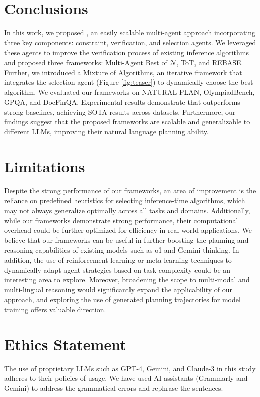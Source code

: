 \section{Conclusions}
\label{sec:conclusions}

In this work, we proposed \plangen{}, an easily scalable multi-agent approach incorporating three key components: constraint, verification, and selection agents. We leveraged these agents to improve the verification process of existing inference algorithms and proposed three frameworks: Multi-Agent Best of $\mathcal{N}$, ToT, and REBASE. Further, we introduced a Mixture of Algorithms, an iterative framework that integrates the selection agent (Figure \ref{fig:teaser}) to dynamically choose the best algorithm. We evaluated our frameworks on NATURAL PLAN, OlympiadBench, GPQA, and DocFinQA. Experimental results demonstrate that \plangen{} outperforms strong baselines, achieving SOTA results across datasets. Furthermore, our findings suggest that the proposed frameworks are scalable and generalizable to different LLMs, improving their natural language planning ability.


\section*{Limitations}

Despite the strong performance of our frameworks, an area of improvement is the reliance on predefined heuristics for selecting inference-time algorithms, which may not always generalize optimally across all tasks and domains. Additionally, while our frameworks demonstrate strong performance, their computational overhead could be further optimized for efficiency in real-world applications. We believe that our frameworks can be useful in further boosting the planning and reasoning capabilities of existing models such as o1 and Gemini-thinking. In addition, the use of reinforcement learning or meta-learning techniques to dynamically adapt agent strategies based on task complexity could be an interesting area to explore. Moreover, broadening the scope to multi-modal and multi-lingual reasoning would significantly expand the applicability of our approach, and exploring the use of generated planning trajectories for model training offers valuable direction.

\section*{Ethics Statement}

The use of proprietary LLMs such as GPT-4, Gemini, and Claude-3 in this study adheres to their policies of usage. We have used AI assistants (Grammarly and Gemini) to address the grammatical errors and rephrase the sentences.

